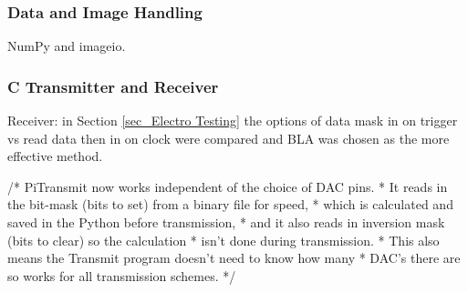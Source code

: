 \documentclass[../main.tex]{subfiles}
\begin{document}
\subsubsection{Data and Image Handling}

NumPy and imageio.\\

\subsubsection{C Transmitter and Receiver}

Receiver: in Section \ref{sec_Electro Testing} the options of data mask in on trigger vs read data then in on clock were compared and BLA was chosen as the more effective method.

/* PiTransmit now works independent of the choice of DAC pins.
* It reads in the bit-mask (bits to set) from a binary file for speed,
* which is calculated and saved in the Python before transmission,
* and it also reads in inversion mask (bits to clear) so the calculation
* isn't done during transmission.
* This also means the Transmit program doesn't need to know how many
* DAC's there are so works for all transmission schemes.
*/
\end{document}
